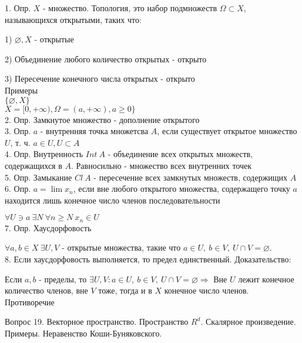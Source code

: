 \documentclass[12pt]{article}
\begin{document}
1. Опр. $X$ - множество. Топология, это набор подмножеств $\Omega \subset X$, называющихся открытыми, таких что:

1) $\varnothing, X$ - открытые
  
2) Объединение любого количество открытых - открыто
  
3) Пересечение конечного числа открытых - открыто\\
  
Примеры\\
$\{\varnothing, X\}$\\
$X = [0, +\infty), \Omega = (a, +\infty), a\geq 0\}$\\

2. Опр. Замкнутое множество - дополнение открытого\\

3. Опр. $a$ - внутренняя точка множетсва $A$, если существует открытое множество $U$, т. ч. $a \in U, U\subset A$\\

4. Опр. Внутренность $Int\ A$ - объединение всех открытых множеств, содержащихся в $A$. Равносильно - множество всех внутренних точек\\

5. Опр. Замыкание $Cl\ A$ - пересечение всех замкнутых множеств, содержищих $A$\\

6. Опр. $a = \lim x_n$, если вне любого открытого множества, содержащего точку $a$ находится лишь конечное число членов последовательности

$\forall U \ni a\ \exists N\ \forall n\geq N\ x_n \in U$\\

7. Опр. Хаусдорфовость

$\forall a, b \in X \ \exists U, V$ - открытые множества, такие что $a\in U,\ b\in V,\ U\cap V = \varnothing$.\\

8. Если хаусдорфовость выполняется, то предел единственный. Доказательство:

Если $a, b$ - пределы, то $\exists U, V : a\in U,\ b\in V,\ U\cap V = \varnothing \Rightarrow $ Вне $U$ лежит конечное количество членов, вне $V$ тоже, тогда и в $X$ конечное число членов. Противоречие
\newpage

\begin{center}
Вопрос 19. Векторное пространство. Пространство $R^d$. Скалярное произведение. Примеры. Неравенство Коши-Буняковского.
\end{center}
\end{document}
